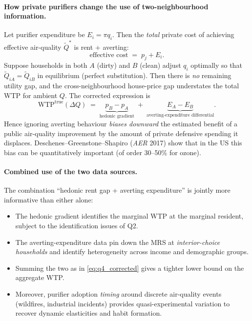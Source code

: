 \documentclass[11pt,a4paper]{article}
\begin{document}
\paragraph{How private purifiers change the use of two-neighbourhood information.}
Let purifier expenditure be $E_{i}=\pi q_{i}$. Then the \emph{total} private cost of achieving effective air-quality $\tilde Q^{*}$ is rent $+$ averting:
\begin{equation}
\text{effective cost}\;=\;p_{j}+E_{i}.
\label{eq:q4_totalcost}
\end{equation}
Suppose households in both $A$ (dirty) and $B$ (clean) adjust $q_{i}$ optimally so that $\tilde Q_{iA}=\tilde Q_{iB}$ in equilibrium (perfect substitution). Then there is \emph{no} remaining utility gap, and the cross-neighbourhood house-price gap understates the total WTP for ambient $Q$. The corrected expression is
\begin{equation}
\mathrm{WTP}^{\text{true}}(\Delta Q)\;=\;\underbrace{p_{B}-p_{A}}_{\text{hedonic gradient}}\;+\;\underbrace{E_{A}-E_{B}}_{\text{averting-expenditure differential}}.
\label{eq:q4_corrected}
\end{equation}
Hence ignoring averting behaviour \emph{biases downward} the estimated benefit of a public air-quality improvement by the amount of private defensive spending it displaces. Deschenes--Greenstone--Shapiro (\emph{AER} 2017) show that in the US this bias can be quantitatively important (of order 30--50\% for ozone).

\paragraph{Combined use of the two data sources.}
The combination ``hedonic rent gap + averting expenditure'' is jointly more informative than either alone:
\begin{itemize}[leftmargin=*,itemsep=1pt]
    \item The hedonic gradient identifies the marginal WTP at the marginal resident, subject to the identification issues of Q2.
    \item The averting-expenditure data pin down the MRS at \emph{interior-choice households} and identify heterogeneity across income and demographic groups.
    \item Summing the two as in \eqref{eq:q4_corrected} gives a tighter lower bound on the aggregate WTP.
    \item Moreover, purifier adoption \emph{timing} around discrete air-quality events (wildfires, industrial incidents) provides quasi-experimental variation to recover dynamic elasticities and habit formation.
\end{itemize}
\end{document}
